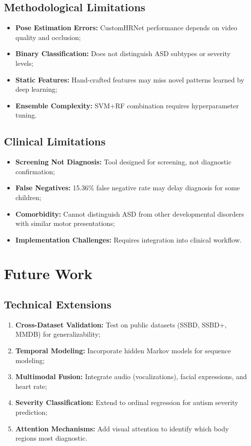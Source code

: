 \documentclass[conference]{IEEEtran}
\begin{document}
\subsection{Methodological Limitations}

\begin{itemize}
\item \textbf{Pose Estimation Errors:} CustomHRNet performance depends on video quality and occlusion;
\item \textbf{Binary Classification:} Does not distinguish ASD subtypes or severity levels;
\item \textbf{Static Features:} Hand-crafted features may miss novel patterns learned by deep learning;
\item \textbf{Ensemble Complexity:} SVM+RF combination requires hyperparameter tuning.
\end{itemize}

\subsection{Clinical Limitations}

\begin{itemize}
\item \textbf{Screening Not Diagnosis:} Tool designed for screening, not diagnostic confirmation;
\item \textbf{False Negatives:} 15.36\% false negative rate may delay diagnosis for some children;
\item \textbf{Comorbidity:} Cannot distinguish ASD from other developmental disorders with similar motor presentations;
\item \textbf{Implementation Challenges:} Requires integration into clinical workflow.
\end{itemize}

\section{Future Work}

\subsection{Technical Extensions}

\begin{enumerate}
\item \textbf{Cross-Dataset Validation:} Test on public datasets (SSBD, SSBD+, MMDB) for generalizability;
\item \textbf{Temporal Modeling:} Incorporate hidden Markov models for sequence modeling;
\item \textbf{Multimodal Fusion:} Integrate audio (vocalizations), facial expressions, and heart rate;
\item \textbf{Severity Classification:} Extend to ordinal regression for autism severity prediction;
\item \textbf{Attention Mechanisms:} Add visual attention to identify which body regions most diagnostic.
\end{enumerate}
\end{document}
